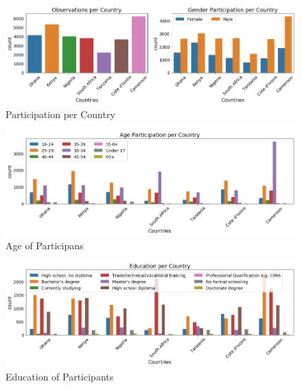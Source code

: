 \begin{Schunk}
\begin{figure}[H]

{\centering \includegraphics[width=1.15\linewidth]{../../artifacts/obs_per_country} 

}

\caption[Participation per Country]{Participation per Country}\label{fig:pc}
\end{figure}
\end{Schunk}

\begin{Schunk}
\begin{figure}[H]

{\centering \includegraphics[width=1.15\linewidth]{../../artifacts/participant_age} 

}

\caption[Age of Participans]{Age of Participans}\label{fig:pa}
\end{figure}
\end{Schunk}

\begin{Schunk}
\begin{figure}[H]

{\centering \includegraphics[width=1.15\linewidth]{../../artifacts/participant_education} 

}

\caption[Education of Participants]{Education of Participants}\label{fig:pe}
\end{figure}
\end{Schunk}


